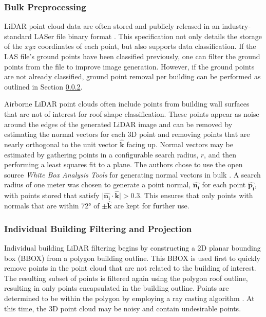 \subsubsection{Bulk Preprocessing}\label{section:lidar_preprocess}
LiDAR point cloud data are often stored and publicly released in an industry-standard LASer file binary format \cite{samberg2007implementation}. This specification not only details the storage of the $xyz$ coordinates of each point, but also supports data classification. If the LAS file's ground points have been classified previously, one can filter the ground points from the file to improve image generation. However, if the ground points are not already classified, ground point removal per building can be performed as outlined in Section \ref{section:lidar_filtering}.

{Airborne LiDAR point clouds often include points from building wall surfaces that are not of interest for roof shape classification. These points appear as noise around the edges of the generated LiDAR image and can be removed by estimating the normal vectors for each 3D point and removing points that are nearly orthogonal to the unit vector $\boldsymbol{\hat{k}}$  facing up. Normal vectors may be estimated by gathering points in a configurable search radius, $r$, and then performing a least squares fit to a plane.  The authors chose to use the open source \emph{White Box Analysis Tools} for generating normal vectors in bulk \cite{lindsay_whitebox_2016}.  A search radius of one meter was chosen to generate a point normal, $\boldsymbol{\hat{n_i}}$ for each point $\boldsymbol{\hat{p_i}}$, with points stored that satisfy $\big| \boldsymbol{\hat{n_i}} \cdot \boldsymbol{\hat{\textbf{k}}}\big| > 0.3$. This ensures that only points with normals that are within \ang{72} of $\pm \hat{\textbf{k}}$ are kept for further use.   }


\subsubsection{Individual Building Filtering and Projection}\label{section:lidar_filtering}

Individual building LiDAR filtering begins by constructing a 2D planar bounding box (BBOX) from a polygon building outline.  This BBOX is used first to quickly remove points in the point cloud that are not related to the building of interest.  The resulting subset of points is filtered again using the polygon roof outline, resulting in only points encapsulated in the building outline. Points are determined to be within the   polygon by employing a ray casting algorithm \cite{samosky_sectionviewsystem_1993}. At this time, the 3D point cloud may be noisy and contain undesirable points. 

